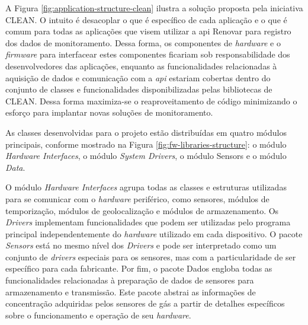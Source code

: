 A Figura \ref{fig:application-structure-clean} ilustra a solução proposta pela iniciativa CLEAN. O intuito é desacoplar o que é específico de cada aplicação e o que é comum para todas as aplicações que visem utilizar a \acrshort{api} Renovar para registro dos dados de monitoramento. Dessa forma, os componentes de \textit{hardware} e o \textit{firmware} para interfacear estes componentes ficariam sob responsabilidade dos desenvolvedores das aplicações, enquanto as funcionalidades relacionadas à aquisição de dados e comunicação com a \textit{api} estariam cobertas dentro do conjunto de classes e funcionalidades disponibilizadas pelas bibliotecas de CLEAN. Dessa forma maximiza-se o reaproveitamento de código minimizando o esforço para implantar novas soluções de monitoramento.

As classes desenvolvidas para o projeto estão distribuídas em quatro módulos principais, conforme mostrado na Figura \ref{fig:fw-libraries-structure}: o módulo \textit{Hardware Interfaces}, o módulo \textit{System Drivers}, o módulo \textit{}{Sensors} e o módulo \textit{Data}.

O módulo \textit{Hardware Interfaces} agrupa todas as classes e estruturas utilizadas para se comunicar com o \textit{hardware} periférico, como sensores, módulos de temporização, módulos de geolocalização e módulos de armazenamento. Os \textit{Drivers} implementam funcionalidades que podem ser utilizadas pelo programa principal independentemente do \textit{hardware} utilizado em cada dispositivo. O pacote \textit{Sensors} está no mesmo nível dos \textit{Drivers} e pode ser interpretado como um conjunto de \textit{drivers} especiais para os sensores, mas com a particularidade de ser específico para cada fabricante. Por fim, o pacote Dados engloba todas as funcionalidades relacionadas à preparação de dados de sensores para armazenamento e transmissão. Este pacote abstrai as informações de concentração adquiridas pelos sensores de gás a partir de detalhes específicos sobre o funcionamento e operação de seu \textit{hardware}.

